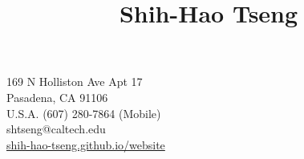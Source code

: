 \title{Shih-Hao Tseng}{
169 N Holliston Ave Apt 17\\
Pasadena, CA 91106\\
U.S.A.
}{
(607) 280-7864 (Mobile)\\
shtseng@caltech.edu\\
\href{http://shih-hao-tseng.github.io/website}{shih-hao-tseng.github.io/website}%
}